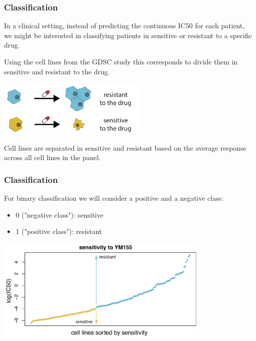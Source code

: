\documentclass[notes]{beamer}          %
\begin{document}
\begin{frame}
\frametitle{Classification}
In a clinical setting, instead of predicting the continuous IC50 for each patient, we might be interested in classifying patients in sensitive or resistant to a specific drug.

\vspace{5mm} 

Using the cell lines from the GDSC study this corresponds to divide them in sensitive and resistant to the drug. 

\begin{center}
\includegraphics[height=2.7cm]{../figures/week_2_linear_models/GDSC_classification_overview.pdf}
\end{center}

Cell lines are separated in sensitive and resistant based on the average response across all cell lines in the panel.

\end{frame}

\begin{frame}
\frametitle{Classification}

For binary classification we will consider a positive and a negative class:

\begin{itemize}
    \item 0 ("negative class"): sensitive
    \item 1 ("positive class"): resistant
\end{itemize}

\begin{center}
\includegraphics[height=5cm]{../figures/week_2_linear_models/GDSC_classification_sensitivity.pdf}
\end{center}
\end{frame}
\end{document}
